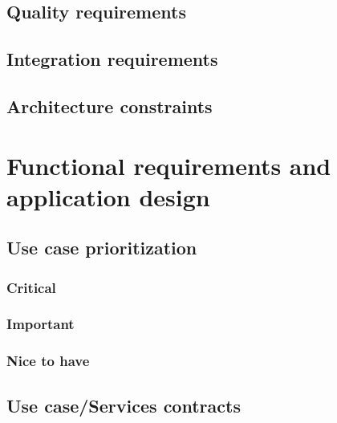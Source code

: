 \documentclass[a4paper, 10pt, oneside]{article}
\begin{document}
	\subsection{Quality requirements}
	\subsection{Integration requirements}
	\subsection{Architecture constraints}

\section{ Functional requirements and application design}
	\subsection{Use case prioritization}
		\subsubsection{Critical}
		\subsubsection{Important}
		\subsubsection{Nice to have}
	\subsection{Use case/Services contracts}
\end{document}

